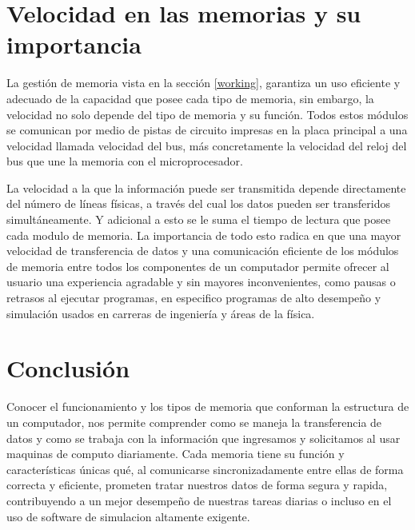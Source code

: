 \documentclass{article}
\begin{document}
\section{Velocidad en las memorias y su importancia}

La gestión de memoria vista en la sección \ref{working}, garantiza un uso eficiente y adecuado de la capacidad que posee cada tipo de memoria, sin embargo, la velocidad no solo depende del tipo de memoria y su función. Todos estos módulos se comunican por medio de pistas de circuito impresas en la placa principal a una velocidad llamada velocidad del bus, más concretamente la velocidad del reloj del bus que une la memoria con el microprocesador. \cite{augusto}

La velocidad a la que la información puede ser transmitida depende directamente del número de líneas físicas, a través del cual los datos pueden ser transferidos simultáneamente. Y adicional a esto se le suma el tiempo de lectura que posee cada modulo de memoria. La importancia de todo esto radica en que una mayor velocidad de transferencia de datos y una comunicación eficiente de los módulos de memoria entre todos los componentes de un computador permite ofrecer al usuario una experiencia agradable y sin mayores inconvenientes, como pausas o retrasos al ejecutar programas, en especifico programas de alto desempeño  y simulación usados en carreras de ingeniería y áreas de la física.


\section{Conclusión}
Conocer el funcionamiento y los tipos de memoria que conforman la estructura de un computador, nos permite comprender como se maneja la transferencia de datos y como se trabaja con la información que ingresamos y solicitamos al usar maquinas de computo diariamente. Cada memoria tiene su función y características únicas qué, al comunicarse sincronizadamente entre ellas de forma correcta y eficiente, prometen tratar nuestros datos de forma segura y rapida, contribuyendo a un mejor desempeño de nuestras tareas diarias o incluso en el uso de software de simulacion altamente exigente.



\end{document}
